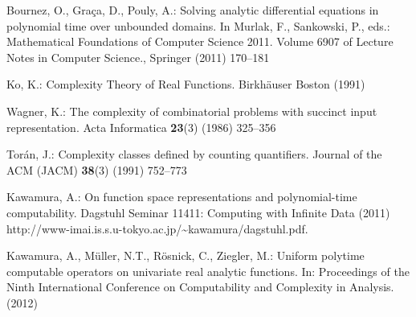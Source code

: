 \documentclass[envcountsame]{llncs}
\begin{document}
\begin{thebibliography}{10}
Bournez, O., Gra{\c c}a, D., Pouly, A.:
\newblock Solving analytic differential equations in polynomial time over
  unbounded domains.
\newblock In Murlak, F., Sankowski, P., eds.: Mathematical Foundations of
  Computer Science 2011. Volume 6907 of Lecture Notes in Computer Science.,
  Springer (2011)  170--181

Ko, K.:
\newblock Complexity Theory of Real Functions.
\newblock Birkh{\"a}user Boston (1991)

Wagner, K.:
\newblock The complexity of combinatorial problems with succinct input
  representation.
\newblock Acta Informatica \textbf{23}(3) (1986)  325--356

Tor{\'a}n, J.:
\newblock Complexity classes defined by counting quantifiers.
\newblock Journal of the ACM (JACM) \textbf{38}(3) (1991)  752--773

Kawamura, A.:
\newblock On function space representations and polynomial-time computability.
\newblock Dagstuhl Seminar 11411: Computing with Infinite Data (2011)
  http://www-imai.is.s.u-tokyo.ac.jp/{\~{}}kawamura/dagstuhl.pdf.

Kawamura, A., M{\"u}ller, N.T., R{\"o}snick, C., Ziegler, M.:
\newblock Uniform polytime computable operators on univariate real analytic
  functions.
\newblock In: Proceedings of the Ninth International Conference on
  Computability and Complexity in Analysis. (2012)

\end{thebibliography}
\end{document}
